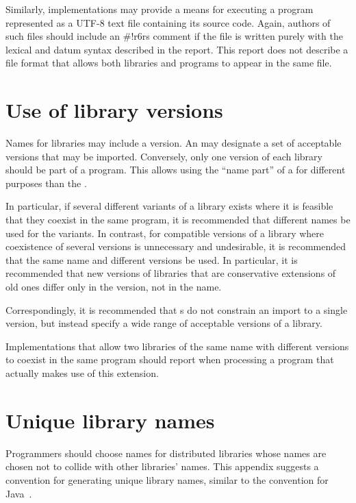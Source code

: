 \documentclass[twoside,twocolumn]{algol60}
\begin{document}
Similarly, implementations may provide a means for executing a program
represented as a UTF-8 text file containing its source code.  Again,
authors of such files should include an {\cf\#!r6rs}
comment if the file is written purely with the lexical and datum syntax
described in the report.  This report does not describe a file format
that allows both libraries and programs to appear in the same file.

\chapter{Use of library versions}

Names for libraries may include a version.  An  may
designate a set of acceptable versions that may be imported.
Conversely, only one version of each library should be part of a
program.  This allows using the ``name part'' of a  for different purposes than the . 

In particular, if several different variants of a library exists where
it is feasible that they coexist in the same program, it is
recommended that different names be used for the variants.  In
contrast, for compatible versions of a library where coexistence of
several versions is unnecessary and undesirable, it is recommended
that the same name and different versions be used.  In particular, it
is recommended that new versions of libraries that are conservative
extensions of old ones differ only in the version, not in the name.

Correspondingly, it is recommended that s do not
constrain an import to a single version, but instead specify a wide
range of acceptable versions of a library.

Implementations that allow two libraries of the same name with
different versions to coexist in the same program should
report when processing a program that actually makes use of this
extension.

\chapter{Unique library names}
\label{librarynamesappendix}

Programmers should choose names for distributed libraries
whose names are chosen not to collide with other libraries' names.
This appendix suggests a convention for generating unique library
names, similar to the convention for Java~\cite{JLS3}.
\end{document}
